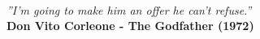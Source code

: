 \
\vfill

\begin{flushright}
    \hfill \textit{''I'm going to make him an offer he can't refuse.''} \\
    \bf{Don Vito Corleone - The Godfather (1972)}
\end{flushright}

\vspace*{1cm}